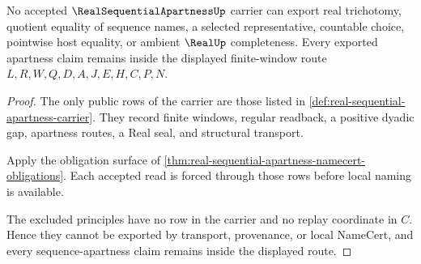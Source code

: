 \begin{theorem}\label{thm:real-sequential-apartness-nonescape}
No accepted $\RealSequentialApartnessUp$ carrier can export real trichotomy, quotient equality of sequence names, a selected representative, countable choice, pointwise host equality, or ambient $\RealUp$ completeness. Every exported apartness claim remains inside the displayed finite-window route $L,R,W,Q,D,A,J,E,H,C,P,N$.
\end{theorem}
\begin{proof}
The only public rows of the carrier are those listed in \autoref{def:real-sequential-apartness-carrier}. They record finite windows, regular readback, a positive dyadic gap, apartness routes, a Real seal, and structural transport.

Apply the obligation surface of \autoref{thm:real-sequential-apartness-namecert-obligations}. Each accepted read is forced through those rows before local naming is available.

The excluded principles have no row in the carrier and no replay coordinate in $C$. Hence they cannot be exported by transport, provenance, or local NameCert, and every sequence-apartness claim remains inside the displayed route.
\end{proof}





